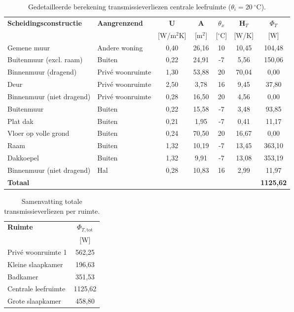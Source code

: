 \documentclass[a4paper,12pt]{article}
\begin{document}
\begin{table}[H]
\centering
\small
\caption{Gedetailleerde berekening transmissieverliezen centrale leefruimte ($\theta_i = 20~^\circ\text{C}$).}
\label{tab:transmissie_leefruimte}
\begin{tabularx}{\textwidth}{>{\raggedright\arraybackslash}X >{\raggedright\arraybackslash}X ccccc}
\toprule
\rowcolor{gray!20} %
\textbf{Scheidingsconstructie} & \textbf{Aangrenzend} & \textbf{U} & \textbf{A} & \textbf{$\theta_x$} & \textbf{H$_T$} & \textbf{$\Phi_{T}$} \\
\rowcolor{gray!20} %
 & & \scriptsize[W/m$^2$K] & \scriptsize[m$^2$] & \scriptsize[$^\circ$C] & \scriptsize[W/K] & \scriptsize[W] \\ \midrule
Gemene muur & Andere woning & 0,40 & 26,16 & 10 & 10,45 & 104,48 \\
Buitenmuur (excl. raam) & Buiten & 0,22 & 24,91 & -7 & 5,56 & 150,06 \\
Binnenmuur (dragend) & Privé woonruimte & 1,30 & 53,88 & 20 & 70,04 & 0,00 \\
Deur & Privé woonruimte & 2,50 & 3,78 & 16 & 9,45 & 37,80 \\
Binnenmuur (niet dragend) & Privé woonruimte & 0,28 & 16,50 & 20 & 4,56 & 0,00 \\
Buitenmuur & Buiten & 0,22 & 15,58 & -7 & 3,48 & 93,85 \\
Plat dak & Buiten & 0,21 & 1,95 & -7 & 0,41 & 11,17 \\
Vloer op volle grond & Buiten & 0,24 & 70,50 & 20 & 16,67 & 0,00 \\
Raam & Buiten & 1,32 & 10,19 & -7 & 13,45 & 363,10 \\
Dakkoepel & Buiten & 1,32 & 9,91 & -7 & 13,08 & 353,19 \\
Binnenmuur (niet dragend) & Hal & 0,28 & 10,83 & 16 & 2,99 & 11,97 \\ \midrule
\textbf{Totaal} & & & & & & \textbf{1125,62} \\ \bottomrule
\end{tabularx}
\end{table}

\begin{table}[H]
\centering
\small
\caption{Samenvatting totale transmissieverliezen per ruimte.}
\label{tab:transmissie_overzicht}
\begin{tabular}{lc}
\toprule
\rowcolor{gray!20}
\textbf{Ruimte} & \textbf{$\Phi_{T,\text{tot}}$} \\
\rowcolor{gray!20}
& \scriptsize[W] \\ \midrule
Privé woonruimte 1  & 562,25 \\
Kleine slaapkamer   & 196,63 \\
Badkamer            & 351,53 \\
Centrale leefruimte & 1125,62 \\
Grote slaapkamer    & 458,80 \\ \bottomrule
\end{tabular}
\end{table}
\end{document}
